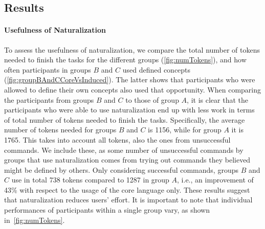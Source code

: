 \subsection{Results}

\paragraph*{\textbf{Usefulness of Naturalization}}
To assess the usefulness of naturalization, we compare the total number of
tokens needed to finish the tasks for the different groups
(\autoref{fig:numTokens}), and how often participants in groups $B$ and $C$ used
defined concepts (\autoref{fig:groupBAndCCoreVsInduced}).
The latter shows that participants who were allowed to define their own concepts
also used that opportunity.
When comparing the participants from groups $B$ and $C$ to those of group $A$, 
it is clear that the participants who were able to use naturalization end up with less work in 
terms of total number of tokens needed to finish the tasks. 
Specifically, the average number of tokens needed for groups $B$ and $C$ is 1156, 
while for group $A$ it is 1765. 
This takes into account all tokens, also the ones from unsuccessful commands. 
We include these, as some number of unsuccessful commands by groups that use naturalization comes from trying 
out commands they believed might be defined by others.
Only considering successful commands, groups $B$ and $C$ use in total 738 tokens compared to 1287 in group $A$, 
i.e., an improvement of 43\% with respect to the usage of the core language only.
These results suggest that naturalization reduces users' effort. 
It is important to note that individual performances of participants within a single group vary, as shown in~\autoref{fig:numTokens}.

